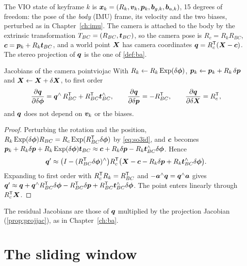 The VIO state of keyframe $k$ is $\bm{x}_k=(R_k,\bm{v}_k,\bm{p}_k,
\bm{b}_{g,k},\bm{b}_{a,k})$, 15 degrees of freedom: the pose of the
\emph{body} (IMU) frame, its velocity and the two biases, perturbed as in
Chapter~\ref{ch:imu}. The camera is attached to the body by the
extrinsic transformation $T_{BC}=(R_{BC},\bm{t}_{BC})$, so the camera
pose is $R_c=R_kR_{BC}$, $\bm{c}=\bm{p}_k+R_k\bm{t}_{BC}$, and a world
point $\bm{X}$ has camera coordinates $\bm{q}=R_c^{\mathsf{T}}(\bm{X}-\bm{c})$.
The stereo projection of $\bm{q}$ is the one of \cref{def:ba}.

\begin{proposition}{Jacobians of the camera point}{viojac}
With $R_k\leftarrow R_k\operatorname{Exp}(\delta\bm{\phi})$, $\bm{p}_k\leftarrow\bm{p}_k+R_k\,
\delta\bm{p}$ and $\bm{X}\leftarrow\bm{X}+\delta\bm{X}$, to first order
\begin{equation}\label{eq:viojac}
\frac{\partial\bm{q}}{\partial\delta\bm{\phi}}=\bm{q}^{\wedge}\,R_{BC}^{\mathsf{T}}+
R_{BC}^{\mathsf{T}}\bm{t}_{BC}^{\wedge},\qquad
\frac{\partial\bm{q}}{\partial\delta\bm{p}}=-R_{BC}^{\mathsf{T}},\qquad
\frac{\partial\bm{q}}{\partial\delta\bm{X}}=R_c^{\mathsf{T}},
\end{equation}
and $\bm{q}$ does not depend on $\bm{v}_k$ or the biases.
\end{proposition}

\begin{proof}
Perturbing the rotation and the position,
$R_k\operatorname{Exp}(\delta\bm{\phi})R_{BC}=R_c\operatorname{Exp}(R_{BC}^{\mathsf{T}}\delta\bm{\phi})$ by
\eqref{eq:so3id}, and $\bm{c}$ becomes
$\bm{p}_k+R_k\delta\bm{p}+R_k\operatorname{Exp}(\delta\bm{\phi})\bm{t}_{BC}\approx\bm{c}+R_k
\delta\bm{p}-R_k\bm{t}_{BC}^{\wedge}\delta\bm{\phi}$. Hence
\[
\bm{q}'\approx\bigl(I-(R_{BC}^{\mathsf{T}}\delta\bm{\phi})^{\wedge}\bigr)R_c^{\mathsf{T}}
\bigl(\bm{X}-\bm{c}-R_k\delta\bm{p}+R_k\bm{t}_{BC}^{\wedge}\delta\bm{\phi}
\bigr).
\]
Expanding to first order with $R_c^{\mathsf{T}} R_k=R_{BC}^{\mathsf{T}}$ and
$-\bm{a}^{\wedge}\bm{q}=\bm{q}^{\wedge}\bm{a}$ gives
$\bm{q}'\approx\bm{q}+\bm{q}^{\wedge}R_{BC}^{\mathsf{T}}\delta\bm{\phi}-R_{BC}^{\mathsf{T}}
\delta\bm{p}+R_{BC}^{\mathsf{T}}\bm{t}_{BC}^{\wedge}\delta\bm{\phi}$. The point enters
linearly through $R_c^{\mathsf{T}}\bm{X}$.
\end{proof}

The residual Jacobians are those of $\bm{q}$ multiplied by the
projection Jacobian (\cref{prop:projjac}), as in Chapter~\ref{ch:ba}.

\section{The sliding window}

